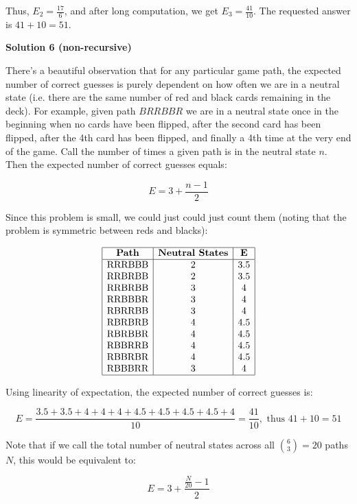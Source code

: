 \begin{enumerate}
{{ Thus, $E_2 = \frac{17}{6}$, and after long computation, we get $E_3 = \frac{41}{10}$. The requested answer is $41 + 10 = \boxed{51}$.

 



\textbf{Solution 6 (non-recursive)}

There's a beautiful observation that for any particular game path, the expected number of correct guesses is purely dependent on how often we are in a neutral state (i.e. there are the same number of red and black cards remaining in the deck).  For example, given path $BRRBBR$ we are in a neutral state once in the beginning when no cards have been flipped, after the second card has been flipped, after the 4th card has been flipped, and finally a 4th time at the very end of the game.  Call the number of times a given path is in the neutral state $n$.  Then the expected number of correct guesses equals:

 
 \[E = 3 + \frac{n-1}{2}\]

 Since this problem is small, we could just could just count them (noting that the problem is symmetric between reds and blacks):

 
 \[ \begin{array}{|c|c|c|} \hline \textbf{Path} & \textbf{Neutral States} & \textbf{E}\\ \hline \text{RRRBBB} & 2 & 3.5\\ \text{RRBRBB} & 2 & 3.5 \\ \text{RRBRBB} & 3 & 4 \\ \text{RRBBBR} & 3 & 4 \\ \text{RBRRBB} & 3 & 4 \\ \text{RBRBRB} & 4 & 4.5 \\ \text{RBRBBR} & 4 & 4.5 \\ \text{RBBRRB} & 4 & 4.5 \\ \text{RBBRBR} & 4 & 4.5 \\ \text{RBBBRR} & 3 & 4 \\ \hline \end{array} \]

 Using linearity of expectation, the expected number of correct guesses is:

 
 \[E=\frac{3.5+3.5+4+4+4+4.5+4.5+4.5+4.5+4}{10}=\frac{41}{10}, \text{ thus } 41 + 10 = \boxed{51}\]

 Note that if we call the total number of neutral states across all ${6 \choose 3}=20$ paths $N$, this would be equivalent to:

 
 \[E=3 + \frac{\frac{N}{20}-1}{2}\]

}}
\end{enumerate}
